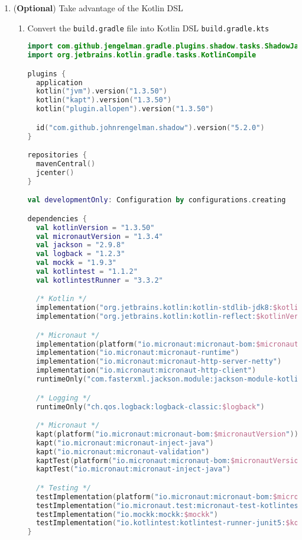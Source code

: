 \begin{enumerate}
\item (\textbf{Optional}) Take advantage of the Kotlin DSL

\begin{enumerate}

\item Convert the \texttt{build.gradle} file into Kotlin DSL \texttt{build.gradle.kts}

\begin{lstlisting}[language=Kotlin]
import com.github.jengelman.gradle.plugins.shadow.tasks.ShadowJar
import org.jetbrains.kotlin.gradle.tasks.KotlinCompile

plugins {
  application
  kotlin("jvm").version("1.3.50")
  kotlin("kapt").version("1.3.50")
  kotlin("plugin.allopen").version("1.3.50")

  id("com.github.johnrengelman.shadow").version("5.2.0")
}

repositories {
  mavenCentral()
  jcenter()
}

val developmentOnly: Configuration by configurations.creating

dependencies {
  val kotlinVersion = "1.3.50"
  val micronautVersion = "1.3.4"
  val jackson = "2.9.8"
  val logback = "1.2.3"
  val mockk = "1.9.3"
  val kotlintest = "1.1.2"
  val kotlintestRunner = "3.3.2"

  /* Kotlin */
  implementation("org.jetbrains.kotlin:kotlin-stdlib-jdk8:$kotlinVersion")
  implementation("org.jetbrains.kotlin:kotlin-reflect:$kotlinVersion")

  /* Micronaut */
  implementation(platform("io.micronaut:micronaut-bom:$micronautVersion"))
  implementation("io.micronaut:micronaut-runtime")
  implementation("io.micronaut:micronaut-http-server-netty")
  implementation("io.micronaut:micronaut-http-client")
  runtimeOnly("com.fasterxml.jackson.module:jackson-module-kotlin:$jackson")

  /* Logging */
  runtimeOnly("ch.qos.logback:logback-classic:$logback")

  /* Micronaut */
  kapt(platform("io.micronaut:micronaut-bom:$micronautVersion"))
  kapt("io.micronaut:micronaut-inject-java")
  kapt("io.micronaut:micronaut-validation")
  kaptTest(platform("io.micronaut:micronaut-bom:$micronautVersion"))
  kaptTest("io.micronaut:micronaut-inject-java")

  /* Testing */
  testImplementation(platform("io.micronaut:micronaut-bom:$micronautVersion"))
  testImplementation("io.micronaut.test:micronaut-test-kotlintest:$kotlintest")
  testImplementation("io.mockk:mockk:$mockk")
  testImplementation("io.kotlintest:kotlintest-runner-junit5:$kotlintestRunner")
}


\end{lstlisting}
\end{enumerate}
\end{enumerate}
